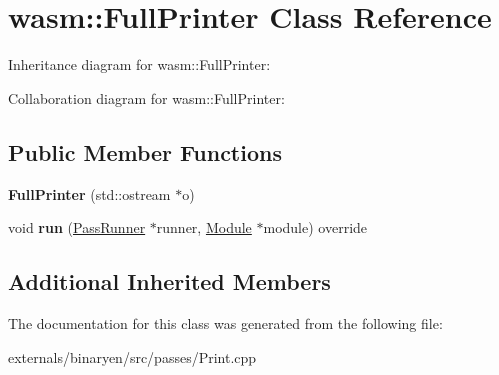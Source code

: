 \hypertarget{classwasm_1_1_full_printer}{}\section{wasm\+:\+:Full\+Printer Class Reference}
\label{classwasm_1_1_full_printer}


Inheritance diagram for wasm\+:\+:Full\+Printer\+:


Collaboration diagram for wasm\+:\+:Full\+Printer\+:
\subsection*{Public Member Functions}
\begin{DoxyCompactItemize}
\item 
\mbox{\label{classwasm_1_1_full_printer_ab48ed77cbb8aae157ec989d76b7cedc1}} 
{\bfseries Full\+Printer} (std\+::ostream $\ast$o)
\item 
\mbox{\label{classwasm_1_1_full_printer_a1bb5e4ace0f107c8b1aa70963af49598}} 
void {\bfseries run} (\mbox{\hyperlink{structwasm_1_1_pass_runner}{Pass\+Runner}} $\ast$runner, \mbox{\hyperlink{classwasm_1_1_module}{Module}} $\ast$module) override
\end{DoxyCompactItemize}
\subsection*{Additional Inherited Members}


The documentation for this class was generated from the following file\+:\begin{DoxyCompactItemize}
\item 
externals/binaryen/src/passes/Print.\+cpp\end{DoxyCompactItemize}
